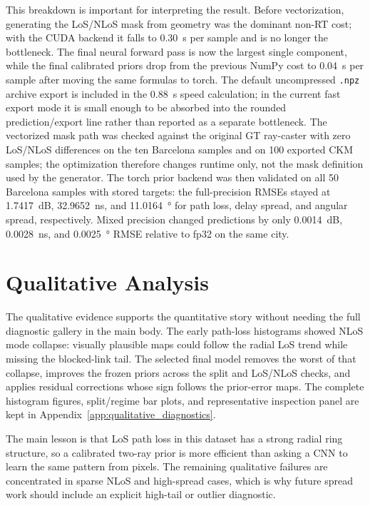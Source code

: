 This breakdown is important for interpreting the result. Before vectorization,
generating the LoS/NLoS mask from geometry was the dominant non-RT cost; with
the CUDA backend it falls to \SI{0.30}{s} per sample and is no longer the
bottleneck. The final neural forward pass is now the largest single component,
while the final calibrated priors drop from the previous NumPy cost to
\SI{0.04}{s} per sample after moving the same formulas to torch. The
default uncompressed \texttt{.npz} archive export is included in the
\SI{0.88}{s} speed calculation; in the current fast export mode it is small
enough to be absorbed into the rounded prediction/export line rather than
reported as a separate bottleneck. The vectorized mask path
was checked against the original GT ray-caster with zero LoS/NLoS differences
on the ten Barcelona samples and on 100 exported CKM samples; the optimization
therefore changes runtime only, not the mask definition used by the generator.
The torch prior backend was then validated on all 50 Barcelona samples with
stored targets: the full-precision RMSEs stayed at \SI{1.7417}{dB},
\SI{32.9652}{ns}, and \SI{11.0164}{\degree} for path loss, delay spread, and
angular spread, respectively. Mixed precision changed predictions by only
\SI{0.0014}{dB}, \SI{0.0028}{ns}, and \SI{0.0025}{\degree} RMSE relative to
fp32 on the same city.

\section{Qualitative Analysis}
\label{sec:qualitative_analysis}

The qualitative evidence supports the quantitative story without needing the full diagnostic gallery in the main body. The early path-loss histograms showed NLoS mode collapse: visually plausible maps could follow the radial LoS trend while missing the blocked-link tail. The selected final model removes the worst of that collapse, improves the frozen priors across the split and LoS/NLoS checks, and applies residual corrections whose sign follows the prior-error maps. The complete histogram figures, split/regime bar plots, and representative inspection panel are kept in Appendix~\ref{app:qualitative_diagnostics}.

The main lesson is that LoS path loss in this dataset has a strong radial ring structure, so a calibrated two-ray prior is more efficient than asking a CNN to learn the same pattern from pixels. The remaining qualitative failures are concentrated in sparse NLoS and high-spread cases, which is why future spread work should include an explicit high-tail or outlier diagnostic.
